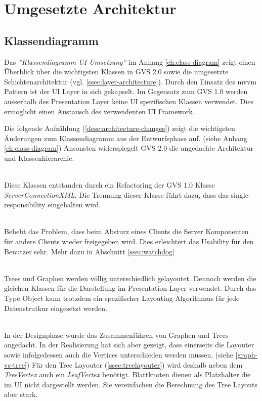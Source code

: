 \documentclass[11pt,a4paper,english,oneside]{book}
\numberwithin{equation}{chapter}
\begin{document}
	\section{Umgesetzte Architektur}
	
	\subsection{Klassendiagramm}
	Das \textit{''Klassendiagramm UI Umsetzung''} im Anhang \ref{ch:class-diagram} zeigt einen Überblick über die wichtigsten Klassen in GVS 2.0 sowie die umgesetzte Schichtenarchitektur (vgl. \ref{ssec:layer-architecture}). Durch den Einsatz des \gls{mvvm} Pattern ist der UI Layer in sich gekapselt. Im Gegensatz zum GVS 1.0 werden ausserhalb des Presentation Layer keine UI spezifischen Klassen verwendet. Dies ermöglicht einen Austausch des verwendenten UI Framework.
	

	\noindent
	Die folgende Aufzählung (\ref{desc:architecture-changes}) zeigt die wichtigsten Änderungen zum Klassendiagramm aus der Entwurfsphase auf. (siehe Anhang \ref{ch:class-diagram}) Ansonsten widerspiegelt GVS 2.0 die angedachte Architektur und Klassenhierarchie.
	
	\begin{description} \label{desc:architecture-changes}
		\item[GvsXmlReader \& ClientConnection ] \hfill \\ Diese Klassen entstanden durch ein Refactoring der GVS 1.0 Klasse \textit{ServerConnectionXML}. Die Trennung dieser Klasse führt dazu, dass das \gls{single-responsibility}  eingehalten wird. 
		\item[Watchdog] \hfill \\ Behebt das Problem, dass beim Absturz eines Clients die Server Komponenten für andere Clients wieder freigegeben wird. Dies erleichtert das Usability für den Benutzer sehr. Mehr dazu in Abschnitt \ref{ssec:watchdog}
		\item[SessionType] \hfill \\ Trees und Graphen werden völlig unterschiedlich gelayoutet. Dennoch werden die gleichen Klassen für die Darstellung im Presentation Layer verwendet. Durch das Type Object kann trotzdem ein spezifischer Layouting Algorithmus für jede Datenstrutkur eingesetzt werden.
		\item[TreeVertex \& LeafVertex] \hfill \\ 
		In der Designphase wurde das Zusammenführen von Graphen und Trees angedacht. In der Realisierung hat sich aber gezeigt, dass einerseits die Layouter sowie infolgedessen auch die Vertices unterschieden werden müssen. (siehe \ref{graph-vs-tree}) Für den Tree Layouter (\ref{ssec:treelayouter}) wird deshalb neben dem \textit{TreeVertex} auch ein \textit{LeafVertex} benötigt.  Blattknoten dienen als Platzhalter die im UI nicht dargestellt werden. Sie vereinfachen die Berechnung des Tree Layouts aber stark.
	\end{description}
	
\end{document}
